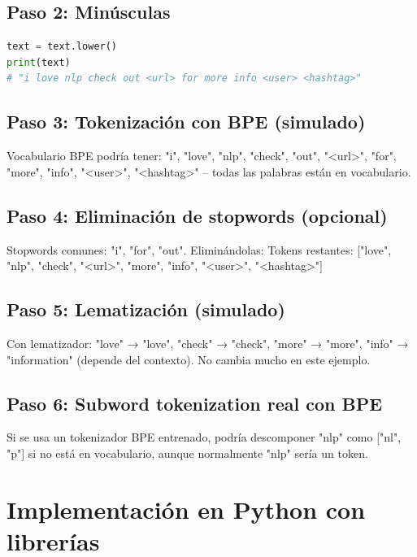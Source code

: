\documentclass[12pt,a4paper,openany,oneside]{book}
\begin{document}
\subsection{Paso 2: Minúsculas}
\begin{lstlisting}[language=Python]
text = text.lower()
print(text)
# "i love nlp check out <url> for more info <user> <hashtag>"
\end{lstlisting}

\subsection{Paso 3: Tokenización con BPE (simulado)}
Vocabulario BPE podría tener: {"i", "love", "nlp", "check", "out", "<url>", "for", "more", "info", "<user>", "<hashtag>"} – todas las palabras están en vocabulario.

\subsection{Paso 4: Eliminación de stopwords (opcional)}
Stopwords comunes: {"i", "for", "out"}. Eliminándolas:
Tokens restantes: ["love", "nlp", "check", "<url>", "more", "info", "<user>", "<hashtag>"]

\subsection{Paso 5: Lematización (simulado)}
Con lematizador: "love" → "love", "check" → "check", "more" → "more", "info" → "information" (depende del contexto). No cambia mucho en este ejemplo.

\subsection{Paso 6: Subword tokenization real con BPE}
Si se usa un tokenizador BPE entrenado, podría descomponer "nlp" como ["nl", "p"] si no está en vocabulario, aunque normalmente "nlp" sería un token.

\section{Implementación en Python con librerías}
\end{document}
